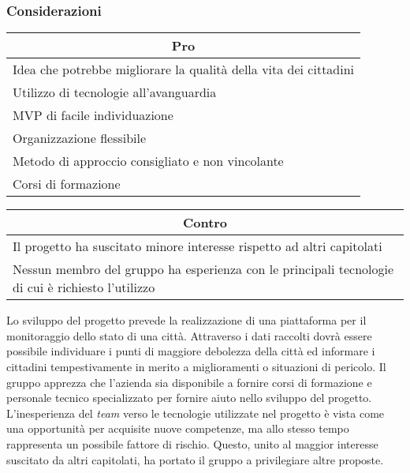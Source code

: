 \subsubsection{Considerazioni}
\begin{minipage}[t]{0.45\linewidth}
    \vspace{0pt}
    {\renewcommand{\arraystretch}{1.5}
    \begin{tabular}{p{1\linewidth}}
        \multicolumn{1}{c}{\textbf{Pro}} \\
        \midrule
        Idea che potrebbe  migliorare la qualità della vita dei cittadini \\
        Utilizzo di tecnologie all'avanguardia \\
        MVP di facile individuazione \\
		Organizzazione flessibile \\
		Metodo di approccio consigliato e non vincolante \\
		Corsi di formazione \\
        \hline
    \end{tabular}
    }
\end{minipage}
\hspace{0.05\linewidth}
\begin{minipage}[t]{0.45\linewidth}
    \vspace{0pt}
    {
    \renewcommand{\arraystretch}{1.5}
    \begin{tabular}{p{1\linewidth}}
        \multicolumn{1}{c}{\textbf{Contro}} \\
        \midrule
        Il progetto ha suscitato minore interesse rispetto ad altri capitolati \\
        Nessun membro del gruppo ha esperienza con le principali tecnologie di cui è richiesto l'utilizzo \\
        \hline
    \end{tabular}
    }
\end{minipage}
\vspace{1em}

Lo sviluppo del progetto prevede la realizzazione di una piattaforma per il monitoraggio dello stato di una città.
Attraverso i dati raccolti dovrà essere possibile individuare i punti di maggiore debolezza della città ed informare i cittadini tempestivamente in merito a miglioramenti o situazioni di pericolo. 
Il gruppo apprezza che l'azienda sia disponibile a fornire corsi di formazione e personale tecnico specializzato per fornire aiuto nello sviluppo del progetto. 
L'inesperienza del \textit{team} verso le tecnologie utilizzate nel progetto è vista come una opportunità per acquisite nuove competenze, ma allo stesso tempo rappresenta un possibile fattore di rischio.
Questo, unito al maggior interesse suscitato da altri capitolati, ha portato il gruppo a privilegiare altre proposte.